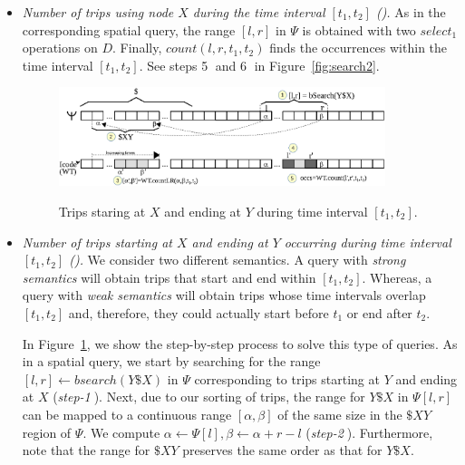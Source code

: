 \begin{itemize}[leftmargin=3mm]
	\item {\em Number of trips using node $X$ during the time interval $[t_1,t_2]$ (\Tux).}
	As in the corresponding spatial query, the range $[l,r]$ in $\Psi$  is obtained with two $select_1$ operations on $D$.
	Finally, $count(l,r,t_1,t_2)$ finds the occurrences within the time interval $[t_1,t_2]$.
	See steps \textcircled{5} and \textcircled{6}  in Figure~\ref{fig:search2}.



\begin{figure}[thb]
	\begin{center}
		{\includegraphics[width=0.90\textwidth]{figures/search.eps}}
	\end{center}
	\vspace{-0.3cm}
	\caption{Trips staring at $X$ and ending at $Y$ during time interval $[t_1,t_2]$.}
	\label{fig:search}
\end{figure}	
	\item {\em Number of trips starting at $X$ and ending at $Y$ occurring during  time interval $[t_1,t_2]$ (\Tfxty).}
	We consider two different semantics. A query with  {\em strong semantics} will obtain trips
	that start and end within  $[t_1,t_2]$. Whereas, a query with  {\em weak semantics} will obtain trips
	whose time intervals overlap  $[t_1,t_2]$ and, therefore, they could actually start before $t_1$ or end after $t_2$.
	
	In Figure~\ref{fig:search}, we show the step-by-step process to solve this type of queries.
	As in a spatial query, we start by searching for the range $[l,r] \leftarrow bsearch(Y\$X)$ in $\Psi$ corresponding 
	to trips starting at $Y$ and ending at $X$ ({\em step-\textcircled{1}}). Next, due to our sorting of trips,  the range for $Y\$X$ in $\Psi[l,r]$
	can be mapped to a continuous range $[\alpha,\beta]$ of the same size in the $\$XY$ region of $\Psi$. We compute $\alpha \leftarrow \Psi[l], 
	\beta\leftarrow\alpha+r-l$ ({\em step-\textcircled{2}}). Furthermore, note that the range for $\$XY$ preserves the same order as that for $Y\$X$.
	

\end{itemize}
